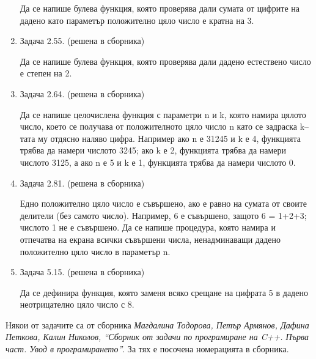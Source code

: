 \documentclass[12pt,a4paper]{article}
\begin{document}
\begin{enumerate}
Да се напише булева функция, която проверява дали сумата от цифрите на дадено като параметър положително цяло число е кратна на 3.

\item Задача 2.55. (решена в сборника)

Да се напише булева функция, която проверява дали дадено естествено число е степен на 2.

\item Задача 2.64. (решена в сборника)

Да се напише целочислена функция с параметри n и k, която намира цялото число, което се получава от положителното цяло число n като се задраска k–тата му отдясно наляво цифра. Например ако n е 31245 и k е 4, функцията трябва да намери числото 3245; ако k е 2, функцията трябва да намери числото 3125, а ако n е 5 и k е 1, функцията трябва да намери числото 0.

\item Задача 2.81. (решена в сборника)

Едно положително цяло число е съвършено, ако е равно на сумата от своите делители (без самото число). Например, 6 е съвършено, защото 6 = 1+2+3; числото 1 не е съвършено. Да се напише процедура, която намира и отпечатва на екрана  всички съвършени числа, ненадминаващи дадено положително цяло число в параметър n.

\item Задача 5.15. (решена в сборника)

Да се дефинира функция, която заменя всяко срещане на цифрата 5 в дадено неотрицателно цяло число с 8.




\end{enumerate}


	\vspace{20px}

	\small{Някои от задачите са от сборника \textit{Магдалина Тодорова, Петър Армянов, Дафина Петкова, Калин Николов, ``Сборник от задачи по програмиране на C++. Първа част. Увод в програмирането''}. За тях е посочена номерацията в сборника.}
\end{document}
